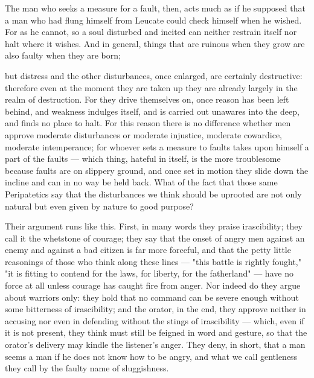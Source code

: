  The man who seeks a measure for a fault, then, acts much as if he supposed that a man who had flung himself from Leucate could check himself when he wished. For as he cannot, so a soul disturbed and incited can neither restrain itself nor halt where it wishes. And in general, things that are ruinous when they grow are also faulty when they are born;

 but distress and the other disturbances, once enlarged, are certainly destructive: therefore even at the moment they are taken up they are already largely in the realm of destruction. For they drive themselves on, once reason has been left behind, and weakness indulges itself, and is carried out unawares into the deep, and finds no place to halt. For this reason there is no difference whether men approve moderate disturbances or moderate injustice, moderate cowardice, moderate intemperance; for whoever sets a measure to faults takes upon himself a part of the faults — which thing, hateful in itself, is the more troublesome because faults are on slippery ground, and once set in motion they slide down the incline and can in no way be held back. What of the fact that those same Peripatetics say that the disturbances we think should be uprooted are not only natural but even given by nature to good purpose?

 Their argument runs like this. First, in many words they praise irascibility; they call it the whetstone of courage; they say that the onset of angry men against an enemy and against a bad citizen is far more forceful, and that the petty little reasonings of those who think along these lines — "this battle is rightly fought," "it is fitting to contend for the laws, for liberty, for the fatherland" — have no force at all unless courage has caught fire from anger. Nor indeed do they argue about warriors only: they hold that no command can be severe enough without some bitterness of irascibility; and the orator, in the end, they approve neither in accusing nor even in defending without the stings of irascibility — which, even if it is not present, they think must still be feigned in word and gesture, so that the orator's delivery may kindle the listener's anger. They deny, in short, that a man seems a man if he does not know how to be angry, and what we call gentleness they call by the faulty name of sluggishness.

